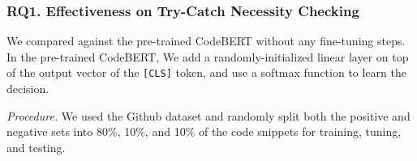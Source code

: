 



\subsubsection{RQ1. Effectiveness on Try-Catch Necessity Checking\\}

 We compared {\xblock} against the pre-trained CodeBERT without any fine-tuning steps. In the pre-trained CodeBERT, We add a randomly-initialized linear layer on top of the output vector of the \texttt{[CLS]} token, and use a softmax function to learn the decision.


{\em Procedure.} We used the Github dataset and randomly split both
the positive and negative sets into 80\%, 10\%, and 10\% of the code
snippets for training, tuning, and testing.


